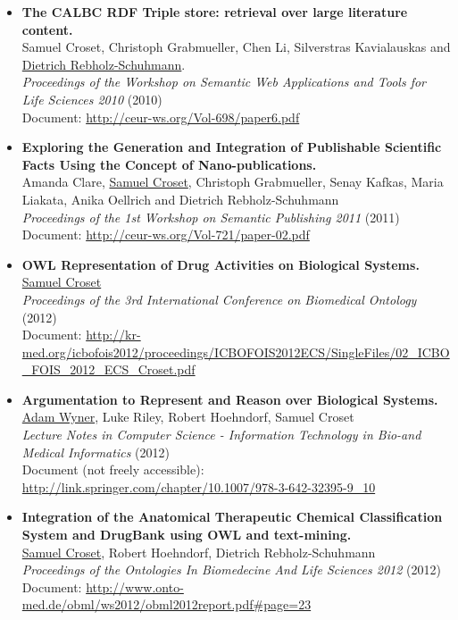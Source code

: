 \begin{itemize}
  \item \textbf{The CALBC RDF Triple store: retrieval over large literature content.} \\ Samuel Croset, Christoph Grabmueller, Chen Li, Silverstras Kavialauskas and \underline{Dietrich Rebholz-Schuhmann}. \\ \emph{Proceedings of the Workshop on Semantic Web Applications and Tools for Life Sciences 2010} (2010) \\ Document: \url{http://ceur-ws.org/Vol-698/paper6.pdf}
  \item \textbf{Exploring the Generation and Integration of Publishable Scientific Facts Using the Concept of Nano-publications.} \\ Amanda Clare, \underline{Samuel Croset}, Christoph Grabmueller, Senay Kafkas, Maria Liakata, Anika Oellrich and Dietrich Rebholz-Schuhmann \\ \emph{Proceedings of the 1st Workshop on Semantic Publishing 2011} (2011) \\ Document: \url{http://ceur-ws.org/Vol-721/paper-02.pdf}
  \item \textbf{OWL Representation of Drug Activities on Biological Systems.} \\ \underline{Samuel Croset} \\ \emph{Proceedings of the 3rd International Conference on Biomedical Ontology} (2012) \\ Document: \url{http://kr-med.org/icbofois2012/proceedings/ICBOFOIS2012ECS/SingleFiles/02_ICBO_FOIS_2012_ECS_Croset.pdf}
  \item \textbf{Argumentation to Represent and Reason over Biological Systems.} \\ \underline{Adam Wyner}, Luke Riley, Robert Hoehndorf, Samuel Croset \\ \emph{Lecture Notes in Computer Science - Information Technology in Bio-and Medical Informatics} (2012) \\ Document (not freely accessible): \url{http://link.springer.com/chapter/10.1007/978-3-642-32395-9_10}
  \item \textbf{Integration of the Anatomical Therapeutic Chemical Classification System and DrugBank using OWL and text-mining.} \\ \underline{Samuel Croset}, Robert Hoehndorf, Dietrich Rebholz-Schuhmann \\ \emph{Proceedings of the Ontologies In Biomedecine And Life Sciences 2012} (2012) \\ Document: \url{http://www.onto-med.de/obml/ws2012/obml2012report.pdf#page=23}

\end{itemize}
